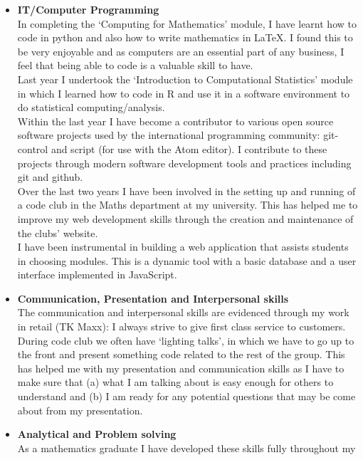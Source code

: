 \documentclass[10pt]{res}
\begin{document}
\begin{resume}
\begin{itemize}
\item \textbf{IT/Computer Programming} \\
In completing the ‘Computing for Mathematics’ module, I have learnt how to code
in python and also how to write mathematics in \LaTeX. I found this to be very
enjoyable and as computers are an essential part of any business, I feel that
being able to code is a valuable skill to have.
\\[4pt]
Last year I undertook the ‘Introduction to Computational Statistics’ module in
which I learned how to code in R and use it in a software environment to do
statistical computing/analysis.
\\[4pt]
Within the last year I have become a contributor to various open source software
projects used by the international programming community: git-control and script
(for use with the Atom editor). I contribute to these projects through modern
software development tools and practices including git and github.
\\[4pt]
Over the last two years I have been involved in the setting up and running of a
code club in the Maths department at my university. This has helped me to
improve my web development skills through the creation and maintenance of the
clubs' website.
\\[4pt]
I have been instrumental in building a web application that assists students
in choosing modules. This is a dynamic tool with a basic database and a user
interface implemented in JavaScript.
\\[-10pt]
\item \textbf{Communication, Presentation and Interpersonal skills} \\
The communication and interpersonal skills are evidenced through my work in
retail (TK Maxx): I always strive to give first class service to customers.
\\[4pt]
During code club we often have `lighting talks', in which we have to go
up to the front and present something code related to the rest of the group.
This has helped me with my presentation and communication skills as I have to
make sure that (a) what I am talking about is easy enough for others to
understand and (b) I am ready for any potential questions that may be come about
from my presentation.
\\[-10pt]
\item \textbf{Analytical and Problem solving} \\
As a mathematics graduate I have developed these skills fully throughout my

\end{itemize}
\end{resume}
\end{document}

